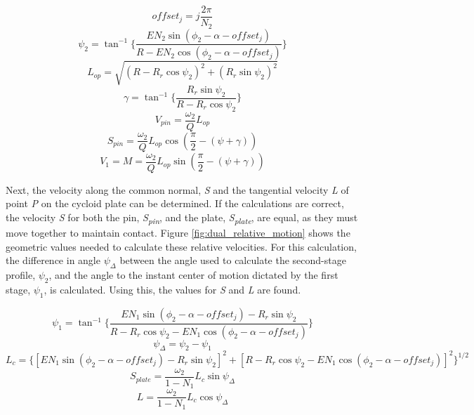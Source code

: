 \begin{equation}\label{eq:offset2}
offset_j = j \frac{2\pi}{N_2}
\end{equation}
\begin{equation}\label{eq:psi2}
\psi_2 = \tan^{-1}\bigg\{\frac{E N_2 \sin(\phi_2-\alpha-offset_j)}{R-E N_2\cos(\phi_2-\alpha-offset_j)}\bigg\}
\end{equation}
\begin{equation} \label{eq:l_op}
L_{op} = \sqrt{(R-R_r\cos\psi_2)^2 + (R_r\sin\psi_2)^2}
\end{equation}
\begin{equation}
\gamma = \tan^{-1}\bigg\{\frac{R_r\sin\psi_2}{R-R_r\cos\psi_2}\bigg\}
\end{equation}
\begin{equation}
V_{pin} = \frac{\omega_2}{Q} L_{op}
\end{equation}
\begin{equation} \label{eq:s_pin}
S_{pin} = \frac{\omega_2}{Q} L_{op} \cos(\frac{\pi}{2}-(\psi+\gamma))
\end{equation}
\begin{equation}
V_{1} = M = \frac{\omega_2}{Q} L_{op} \sin(\frac{\pi}{2}-(\psi+\gamma))
\end{equation}


Next, the velocity along the common normal, \textit{S} and the tangential velocity \textit{L} of point \textit{P} on the cycloid plate can be determined. If the calculations are correct, the velocity \textit{S} for both the pin, \textit{S\textsubscript{pin}}, and the plate, \textit{S\textsubscript{plate}}, are equal, as they must move together to maintain contact. Figure \ref{fig:dual_relative_motion} shows the geometric values needed to calculate these relative velocities. For this calculation, the difference in angle $\psi_\Delta$ between the angle used to calculate the second-stage profile, $\psi_2$, and the angle to the instant center of motion dictated by the first stage, $\psi_1$, is calculated. Using this, the values for \textit{S} and \textit{L} are found. 

\begin{equation}\label{eq:psi_1}
\psi_1 = \tan^{-1}\bigg\{\frac{E N_1 \sin(\phi_2-\alpha-offset_j) - R_r\sin\psi_2}
{R-R_r\cos\psi_2 - E N_1\cos(\phi_2-\alpha-offset_j)}\bigg\}
\end{equation}
\begin{equation} \label{eq:psi_delta}
\psi_{\Delta} = \psi_2 - \psi_1
\end{equation}
\begin{dmath}\label{eq:L_c}
L_{c} = \bigg\{\left[E N_1 \sin(\phi_2-\alpha-offset_j) - R_r\sin\psi_2\right]^2 +
\left[R-R_r\cos\psi_2 - E N_1 \cos(\phi_2-\alpha-offset_j)\right]^{2}\bigg\}^{1/2}
\end{dmath}
\begin{equation}\label{eq:s_plate}
S_{plate} = \frac{\omega_2}{1-N_1} L_c \sin\psi_{\Delta}
\end{equation}
\begin{equation}\label{eq:L}
L = \frac{\omega_2}{1-N_1} L_c \cos\psi_{\Delta}
\end{equation}


